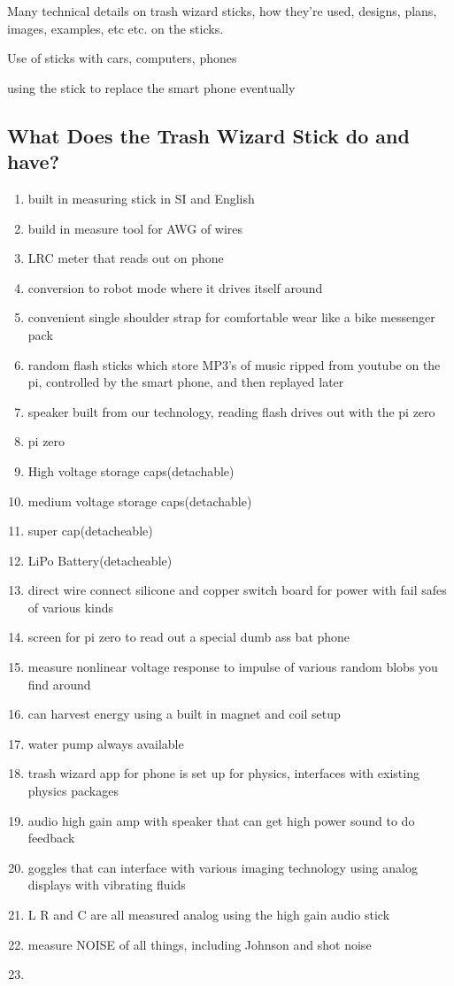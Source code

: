 Many technical details on trash wizard sticks, how they're used,
designs, plans, images, examples, etc etc. on the sticks.

Use of sticks with cars, computers, phones

using the stick to replace the smart phone eventually

\subsection{What Does the Trash Wizard Stick do and
have?}\label{what-does-the-trash-wizard-stick-do-and-have}

\begin{enumerate}
\def\labelenumi{\arabic{enumi}.}
\item
  built in measuring stick in SI and English
\item
  build in measure tool for AWG of wires
\item
  LRC meter that reads out on phone
\item
  conversion to robot mode where it drives itself around
\item
  convenient single shoulder strap for comfortable wear like a bike
  messenger pack
\item
  random flash sticks which store MP3's of music ripped from youtube on
  the pi, controlled by the smart phone, and then replayed later
\item
  speaker built from our technology, reading flash drives out with the
  pi zero
\item
  pi zero
\item
  High voltage storage caps(detachable)
\item
  medium voltage storage caps(detachable)
\item
  super cap(detacheable)
\item
  LiPo Battery(detacheable)
\item
  direct wire connect silicone and copper switch board for power with
  fail safes of various kinds
\item
  screen for pi zero to read out a special dumb ass bat phone
\item
  measure nonlinear voltage response to impulse of various random blobs
  you find around
\item
  can harvest energy using a built in magnet and coil setup
\item
  water pump always available
\item
  trash wizard app for phone is set up for physics, interfaces with
  existing physics packages
\item
  audio high gain amp with speaker that can get high power sound to do
  feedback
\item
  goggles that can interface with various imaging technology using
  analog displays with vibrating fluids
\item
  L R and C are all measured analog using the high gain audio stick
\item
  measure NOISE of all things, including Johnson and shot noise
\item
\end{enumerate}

